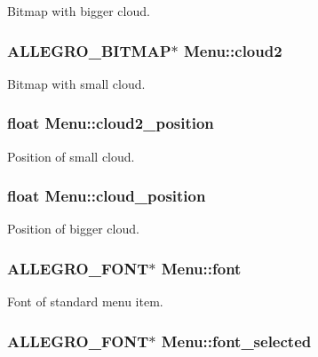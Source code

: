 Bitmap with bigger cloud. \hypertarget{structMenu_a6ee03b8791791ecca4f9a3b9fb1851c1}{
\subsubsection[{cloud2}]{\setlength{\rightskip}{0pt plus 5cm}A\-L\-L\-E\-G\-R\-O\-\_\-\-B\-I\-T\-M\-A\-P$\ast$ Menu\-::cloud2}}\label{structMenu_a6ee03b8791791ecca4f9a3b9fb1851c1}
Bitmap with small cloud. \hypertarget{structMenu_a143c3675204c7cf1381decbfe4be5476}{
\subsubsection[{cloud2\-\_\-position}]{\setlength{\rightskip}{0pt plus 5cm}float Menu\-::cloud2\-\_\-position}}\label{structMenu_a143c3675204c7cf1381decbfe4be5476}
Position of small cloud. \hypertarget{structMenu_a0e6c60743147ff2ead1e0bb2f89d0036}{
\subsubsection[{cloud\-\_\-position}]{\setlength{\rightskip}{0pt plus 5cm}float Menu\-::cloud\-\_\-position}}\label{structMenu_a0e6c60743147ff2ead1e0bb2f89d0036}
Position of bigger cloud. \hypertarget{structMenu_aa4e0229cb315ef9e0ea90263b26a37f8}{
\subsubsection[{font}]{\setlength{\rightskip}{0pt plus 5cm}A\-L\-L\-E\-G\-R\-O\-\_\-\-F\-O\-N\-T$\ast$ Menu\-::font}}\label{structMenu_aa4e0229cb315ef9e0ea90263b26a37f8}
Font of standard menu item. \hypertarget{structMenu_a577ad17dfddafaae41dde63ca7970003}{
\subsubsection[{font\-\_\-selected}]{\setlength{\rightskip}{0pt plus 5cm}A\-L\-L\-E\-G\-R\-O\-\_\-\-F\-O\-N\-T$\ast$ Menu\-::font\-\_\-selected}}\label{structMenu_a577ad17dfddafaae41dde63ca7970003}
